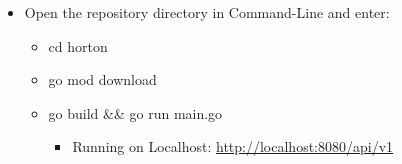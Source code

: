 \begin{itemize}
  \item Open the repository directory in Command-Line and enter:
    \begin{itemize}
    \item cd horton
    \item go mod download
    \item go build \&\& go run main.go
    \begin{itemize}
        \item Running on Localhost: \url{http://localhost:8080/api/v1}
    \end{itemize}
    \end{itemize}
\end{itemize}
